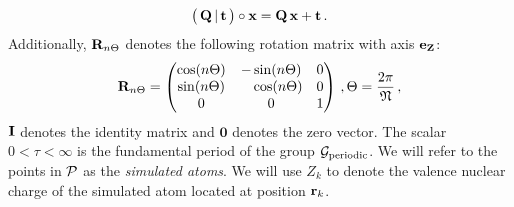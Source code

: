 \documentclass[preprint,12pt, 3p, sort&compress]{elsarticle}
\begin{document}
\begin{align}
\big(\,{{\bf Q}}\,|\,{\bf t} \,\big) \circ {\bf x} ={{\bf Q}}\,{\bf x} + {\bf t} \,.
\end{align}
Additionally, ${{\bf R}}_{n\Theta}$ denotes the following rotation matrix with axis ${\bf e}_{{\bf Z}}$: 
\begin{align}
{{\bf R}}_{n\Theta} = 
\begin{pmatrix}
\cos (n\Theta)  & -\sin (n\Theta)   & 0 \\
\sin (n\Theta)   & \quad\cos (n\Theta)   & 0 \\
0 & 0 & 1
\end{pmatrix}\,,\Theta = \frac{2\pi}{\mathfrak{N}}\,,
\end{align}
${{\bf I}}$ denotes the identity matrix and $\mathbf{0}$ denotes the zero vector. The scalar $0 < \tau <\infty$ is the fundamental period of the group ${\cal G}_{\text{periodic}}$. We will refer to the points in ${\cal P}$ as the \textit{simulated atoms}. We will use $Z_k $ to denote the valence nuclear charge of the simulated atom located at position ${\bf r}_k$.
\end{document}
